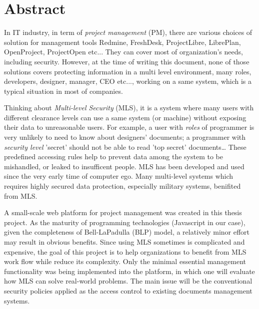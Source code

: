 

\begingroup
\let\clearpage\relax
\let\cleardoublepage\relax
\let\cleardoublepage\relax

\chapter*{Abstract} %

In IT industry, in term of \emph{project management} (PM), there are various choices of solution for management tools \eg Redmine, FreshDesk, ProjectLibre, LibrePlan, OpenProject, ProjectOpen etc...
They can cover most of organization's needs, including security.
However, at the time of writing this document, none of those solutions covers protecting information in a multi level environment, \ie many roles, \eg developers, designer, manager, CEO etc..., working on a same system, which is a typical situation in most of companies. 

Thinking about \emph{Multi-level Security} (MLS), it is a system where many users with different clearance levels can use a same system (or machine) without exposing their data to unreasonable users.
For example, a user with \emph{roles} of programmer is very unlikely to need to know about designers' documents;
a programmer with \emph{security level} 'secret' should not be able to read 'top secret' documents\dots
These predefined accessing rules help to prevent data among the system to be mishandled, or leaked to insufficent people.
MLS has been developed and used since the very early time of computer ego.
Many multi-level systems which requires highly secured data protection, especially military systems, benifited from MLS.

A small-scale web platform for project management was created in this thesis project.
As the maturity of programming technologies (\eg Javascript in our case), given the completeness of Bell-LaPadulla (BLP) model, a relatively minor effort may result in obvious benefits.
Since using MLS sometimes is complicated and expensive, the goal of this project is to help organizations to benefit from MLS work flow while reduce its complexity.
Only the minimal essential management functionality was being implemented into the platform, in which one will evaluate how MLS can solve real-world problems.
The main issue will be the conventional security policies applied as the access control to existing documents management systems.

